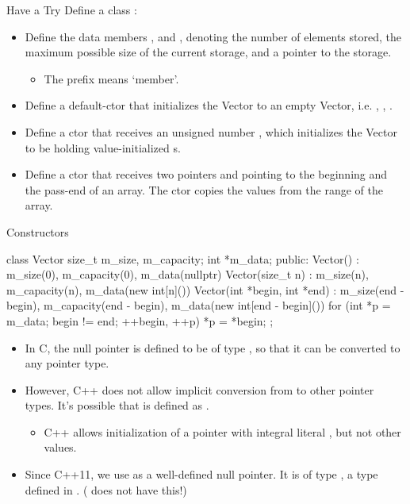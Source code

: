 \documentclass{beamer}
\begin{document}
\begin{frame}[fragile]{Have a Try}
    Define a class :
    \begin{itemize}
        \item Define the data members ,  and , denoting the number of elements stored, the maximum possible size of the current storage, and a pointer to the storage.
        \begin{itemize}
            \item The prefix  means `member'.
        \end{itemize}
        \item Define a default-ctor that initializes the Vector to an empty Vector, i.e. , , .
        \item Define a ctor that receives an unsigned number , which initializes the Vector to be holding  value-initialized s.
        \item Define a ctor that receives two pointers  and  pointing to the beginning and the pass-end of an array. The ctor copies the values from the range of the array.
    \end{itemize}
\end{frame}

\begin{frame}[fragile]{Constructors}
    \begin{cpp}
class Vector {
  size_t m_size, m_capacity;
  int *m_data;
 public:
  Vector() : m_size(0), m_capacity(0), m_data(nullptr) {}
  Vector(size_t n) : m_size(n), m_capacity(n),
    m_data(new int[n]()) {}
  Vector(int *begin, int *end)
    : m_size(end - begin), m_capacity(end - begin),
      m_data(new int[end - begin]()) {
    for (int *p = m_data; begin != end; ++begin, ++p)
      *p = *begin;
  }
};
    \end{cpp}
\end{frame}

\begin{frame}{}
    \begin{itemize}
        \item In C, the null pointer  is defined to be of type \ttt{*}, so that it can be converted to any pointer type.
        \item However, C++ does not allow implicit conversion from \ttt{*} to other pointer types. It's possible that  is defined as .
        \begin{itemize}
            \item C++ allows initialization of a pointer with integral literal , but not other values.
        \end{itemize}
        \item Since C++11, we use  as a well-defined null pointer. It is of type , a type defined in . ( does not have this!)
    \end{itemize}
\end{frame}
\end{document}
